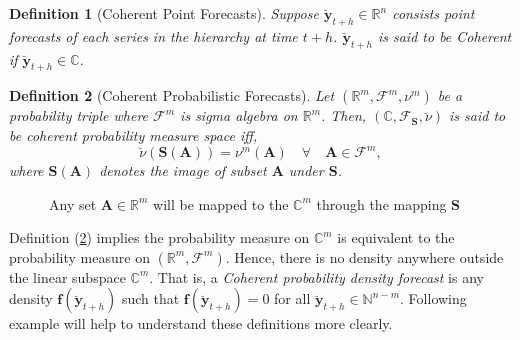 \documentclass[a4paper, 11pt]{article}
\newtheorem{definition}{Definition}[section]
\begin{document}
	\begin{definition}[Coherent Point Forecasts]\label{def:cohpoint}
		Suppose $\bm{\breve{y}}_{t+h} \in \mathbb{R}^n$ consists point forecasts of each series in the hierarchy at time $t+h$.  $\bm{\breve{y}}_{t+h}$ is said to be \textit{Coherent} if $\bm{\breve{y}}_{t+h} \in \bm{\mathbb{C}}$. 
	\end{definition}
	
	\begin{definition}[Coherent Probabilistic Forecasts]\label{def:cohprob}
		Let $(\bm{\mathbb{R}}^m, \bm{\mathscr{F}}^m, \nu^m)$ be a probability triple where $\mathscr{F}^m$ is sigma algebra on $\bm{\mathbb{R}}^m$. Then, $(\bm{\mathbb{C}}, \mathscr{F}_{\bm{S}}, \breve{\nu})$ is said to be coherent probability measure space iff, 
		$$\breve{\nu}(\bm{S}(\bm{A})) = \nu^m(\bm{A}) \quad \forall \quad \bm{A} \in \mathscr{F}^m,$$ 
		where $\bm{S}(\bm{A})$ denotes the image of subset $\bm{A}$ under $\bm{S}$. 
	\end{definition}
	
	\begin{figure}[H]
		\begin{center}
			\newline
		\end{center}
		\caption{Any set $\bm{A} \in \mathbb{R}^m$ will be mapped to the $\bm{\mathbb{C}}^m$ through the mapping $\bm{S}$}
	\end{figure}
	
	Definition (\ref{def:cohprob}) implies the probability measure on $\bm{\mathbb{C}}^m$ is equivalent to the probability measure on $(\bm{\mathbb{R}}^m, \bm{\mathscr{F}}^m)$. Hence, there is no density anywhere outside the linear subspace $\bm{\mathbb{C}}^m$. That is, a \textit{Coherent probability density forecast} is any density $\bm{f}(\bm{\breve{y}}_{t+h})$ such that $\bm{f}(\bm{\breve{y}}_{t+h})=0$ for all $\bm{\breve{y}}_{t+h} \in \bm{\mathbb{N}}^{n-m}$. Following example will help to understand these definitions more clearly.
	
\end{document}
